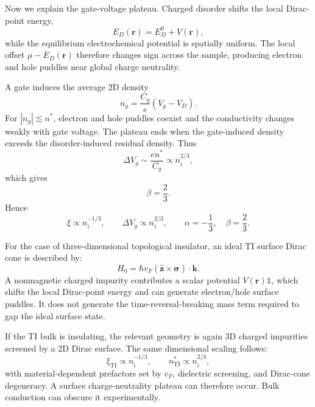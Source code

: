\documentclass[11pt]{article}
\newcommand{\bk}{\mathbf{k}}
\newcommand{\br}{\mathbf{r}}
\begin{document}
Now we explain the gate-voltage plateau. Charged disorder shifts the local Dirac-point energy,
\begin{equation}
    E_D(\br)=E_D^0+V(\br),
\end{equation}
while the equilibrium electrochemical potential is spatially uniform. The local offset $\mu-E_D(\br)$ therefore changes sign across the sample, producing electron and hole puddles near global charge neutrality.

A gate induces the average 2D density
\begin{equation}
    n_g=\frac{C_g}{e}(V_g-V_D).
\end{equation}
For $|n_g|\lesssim n^*$, electron and hole puddles coexist and the conductivity changes weakly with gate voltage. The plateau ends when the gate-induced density exceeds the disorder-induced residual density. Thus
\begin{equation}
    \Delta V_g\sim\frac{e n^*}{C_g}
    \propto n_i^{2/3},
\end{equation}
which gives
\begin{equation}
    \boxed{\beta=\frac23}.
\end{equation}
Hence
\begin{equation}
    \boxed{
    \xi\propto n_i^{-1/3},
    \qquad
    \Delta V_g\propto n_i^{2/3},
    \qquad
    \alpha=-\frac13,
    \quad
    \beta=\frac23.
    }
\end{equation}

For the case of three-dimensional topological insulator, an ideal TI surface Dirac cone is described by:
\begin{equation}
    H_0=\hbar v_F(\hat{\mathbf z}\times\bm{\sigma})\cdot\bk.
\end{equation}
A nonmagnetic charged impurity contributes a scalar potential $V(\br)\mathbb{1}$, which shifts the local Dirac-point energy and can generate electron/hole surface puddles. It does not generate the time-reversal-breaking mass term required to gap the ideal surface state.

If the TI bulk is insulating, the relevant geometry is again 3D charged impurities screened by a 2D Dirac surface. The same dimensional scaling follows:
\begin{equation}
    \xi_{\mathrm{TI}}\propto n_i^{-1/3},
    \qquad
    n^*_{\mathrm{TI}}\propto n_i^{2/3},
\end{equation}
with material-dependent prefactors set by $v_F$, dielectric screening, and Dirac-cone degeneracy. A surface charge-neutrality plateau can therefore occur. Bulk conduction can obscure it experimentally.
\end{document}
